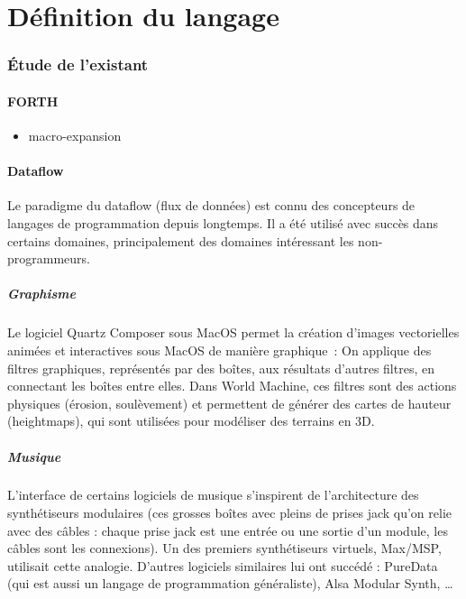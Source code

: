 \documentclass{article}
\begin{document}
\part{Définition du langage}

\section{Étude de l'existant}

\subsection{FORTH}
\begin{itemize}
\item macro-expansion
\end{itemize}
\subsection{Dataflow}

Le paradigme du dataflow (flux de données) est connu des concepteurs de langages de programmation depuis longtemps. Il a été utilisé avec
succès dans certains domaines, principalement des domaines intéressant les non-programmeurs.

\subsubsection{Graphisme}

Le logiciel Quartz Composer sous MacOS permet la création d'images vectorielles animées et interactives sous MacOS de manière graphique~: On
applique des filtres graphiques, représentés par des boîtes, aux résultats d'autres filtres, en connectant les boîtes entre elles. Dans
World Machine, ces filtres sont des actions physiques (érosion, soulèvement) et permettent de générer des cartes de hauteur (heightmaps),
qui sont utilisées pour modéliser des terrains en 3D.

\subsubsection{Musique}

L'interface de certains logiciels de musique s'inspirent de l'architecture des synthétiseurs modulaires\cite{modular-synth} (ces grosses
boîtes avec pleins de prises jack qu'on relie avec des câbles : chaque prise jack est une entrée ou une sortie d'un module, les câbles sont
les connexions). Un des premiers synthétiseurs virtuels, Max/MSP, utilisait cette analogie. D'autres logiciels similaires lui ont succédé :
PureData (qui est aussi un langage de programmation généraliste), Alsa Modular Synth, \dots
\end{document}
